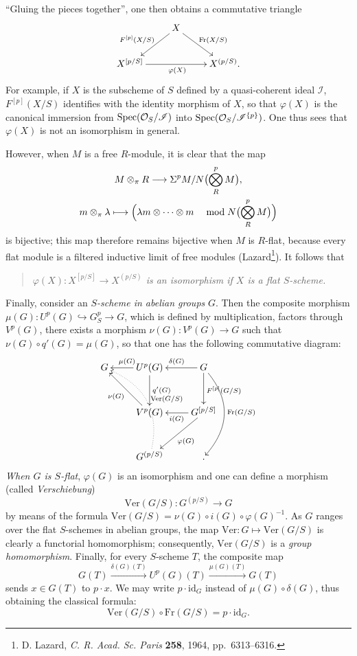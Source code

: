 ``Gluing the pieces together'', one then obtains a commutative triangle
\[
\xymatrix{&X\ar[dl]_{F^{[p]}(X/S)}\ar[dr]^{\mathrm{Fr}(X/S)}&\\X^{[p/S]}\ar[rr]_{\varphi(X)}&&X^{(p/S)}.}
\]
For example, if $X$ is the subscheme of $S$ defined by a quasi-coherent ideal $\mathscr I$, $F^{[p]}(X/S)$ identifies with the identity morphism of $X$, so that $\varphi(X)$ is the canonical immersion from $\operatorname{Spec}(\mathcal{O}_S/\mathscr I)$ into $\operatorname{Spec}(\mathcal{O}_S/\mathscr I^{\{p\}})$. One thus sees that $\varphi(X)$ is not an isomorphism in general.

However, when $M$ is a free $R$-module, it is clear that the map
\[
\begin{gathered}
M\otimes_\pi R\longrightarrow\Sigma^p M/N\bigl(\bigotimes_R^pM\bigr),\\
m\otimes_\pi\lambda\longmapsto\Bigl(\lambda m\otimes\cdots\otimes m\quad\bmod N\bigl(\bigotimes_R^pM\bigr)\Bigr)
\end{gathered}
\]
is bijective; this map therefore remains bijective when $M$ is $R$-flat, because every flat module is a filtered inductive limit of free modules (Lazard{\renewcommand{\thefootnote}{*}\footnote{D. Lazard, \textit{C. R. Acad. Sc. Paris} \textbf{258}, 1964, pp.\ 6313--6316.}}\setcounter{footnote}{46}). It follows that
\begin{quote}\emph{$\varphi(X):X^{[p/S]}\to X^{(p/S)}$ is an isomorphism if $X$ is a flat $S$-scheme.}\end{quote}

Finally, consider an \emph{$S$-scheme in abelian groups} $G$. Then the composite morphism $\mu(G):U^p(G)\hookrightarrow G_S^p\to G$, which is defined by multiplication, factors through $V^p(G)$, \ie there exists a morphism $\nu(G):V^p(G)\to G$ such that $\nu(G)\circ q'(G)=\mu(G)$, so that one has the following commutative diagram:
\[
\xymatrix@C=2.3em@R=3em{G&U^p(G)\ar[l]_{\mu(G)}\ar[d]^{q'(G)}&G\ar[l]_{\delta(G)}\ar[d]^{F^{[p]}(G/S)}\ar@/^1.8pc/[dd]^{\mathrm{Fr}(G/S)}\\
&V^p(G)\ar[ul]^{\nu(G)}&G^{[p/S]}\ar[l]^{i(G)}\ar[dl]^{\varphi(G)}\\
&G^{(p/S)}\ar@{.>}@/_2pc/[uul]_{\mathrm{Ver}(G/S)}&.}
\]
\emph{When $G$ is $S$-flat}, $\varphi(G)$ is an isomorphism and one can define a morphism (called \emph{Verschiebung})
\[
\mathrm{Ver}(G/S):G^{(p/S)}\longrightarrow G
\]
by means of the formula $\mathrm{Ver}(G/S)=\nu(G)\circ i(G)\circ\varphi(G)^{-1}$. As $G$ ranges over the flat $S$-schemes in abelian groups, the map $\mathrm{Ver}:G\mapsto\mathrm{Ver}(G/S)$ is clearly a functorial homomorphism; consequently, $\mathrm{Ver}(G/S)$ is a \emph{group homomorphism}. Finally, for every $S$-scheme $T$, the composite map
\[
G(T)\xrightarrow{\delta(G)(T)}U^p(G)(T)\xrightarrow{\mu(G)(T)}G(T)
\]
sends $x\in G(T)$ to $p\cdot x$. We may write $p\cdot\mathrm{id}_G$ instead of $\mu(G)\circ\delta(G)$, thus obtaining the classical formula:
\begin{equation}\tag{$*$}\mathrm{Ver}(G/S)\circ\mathrm{Fr}(G/S)=p\cdot\mathrm{id}_G.\end{equation}

